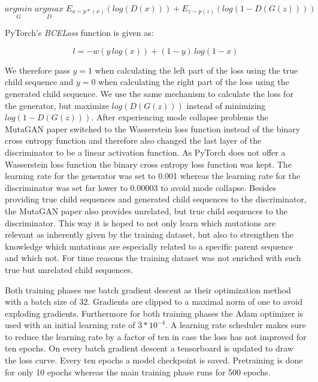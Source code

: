 \begin{equation}
	\underset{G}{arg min} \; \underset{D}{arg max} \; E_{x \sim p*(x)}(log(D(x))) + E_{z \sim p(z)}(log(1-D(G(z))))
\end{equation}

PyTorch's \textit{BCELoss} function is given as:

\begin{equation}
	l = -w(y\,log(x)) + (1-y)\,log(1-x)
\end{equation}

We therefore pass $y=1$ when calculating the left part of the loss using the true child sequence and $y=0$ when calculating the right part of the loss using the generated child sequence. We use the same mechanism to calculate the loss for the generator, but maximize $log(D(G(z)))$ instead of minimizing $log(1-D(G(z)))$. After experiencing mode collapse problems the MutaGAN paper \cite{Berman2020} switched to the Wasserstein loss function instead of the binary cross entropy function and therefore also changed the last layer of the discriminator to be a linear activation function. As PyTorch does not offer a Wasserstein loss function the binary cross entropy loss function was kept. The learning rate for the generator was set to 0.001 whereas the learning rate for the discriminator was set far lower to 0.00003 to avoid mode collapse. Besides providing true child sequences and generated child sequences to the discriminator, the MutaGAN paper \cite{Berman2020} also provides unrelated, but true child sequences to the discriminator. This way it is hoped to not only learn which mutations are relevant as inherently given by the training dataset, but also to strengthen the knowledge which mutations are especially related to a specific parent sequence and which not. For time reasons the training dataset was not enriched with such true but unrelated child sequences. 

Both training phases use batch gradient descent as their optimization method with a batch size of 32. Gradients are clipped to a maximal norm of one to avoid exploding gradients. Furthermore for both training phases the Adam optimizer is used with an initial learning rate of $3*10^{-4}$. A learning rate scheduler makes sure to reduce the learning rate by a factor of ten in case the loss has not improved for ten epochs. On every batch gradient descent a tensorboard is updated to draw the loss curve. Every ten epochs a model checkpoint is saved. Pretraining is done for only 10 epochs whereas the main training phase runs for 500 epochs. 


\newpage
